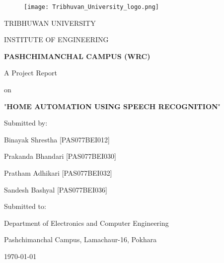 \documentclass[12pt, a4paper, oneside]{report}
\begin{document}
\begin{titlepage}
    \centering
    \begin{figure}
        \centering
        \texttt{[image: Tribhuvan\_University\_logo.png]}
    \end{figure}

    \vspace{1cm}

    {\large{ \MakeUppercase {Tribhuwan University}}\par}
    {\large{ \MakeUppercase {Institute Of Engineering}}\par}
    \vspace{.1cm}
    {\textbf{ \large \MakeUppercase {Pashchimanchal Campus (WRC)}}\par}
    \vspace{2cm}

    {\fontsize{15pt}{18pt}\selectfont 
    A Project Report \par}
    {\fontsize{15pt}{18pt}\selectfont 
    on \par}

    {\large {"\textbf{\MakeUppercase {HOME AUTOMATION USING SPEECH RECOGNITION}}"}\par}
    \vspace{2cm}

    {\fontsize{15pt}{18pt}\selectfont 
        Submitted by:\par
        Binayak Shrestha [PAS077BEI012]\par
        Prakanda Bhandari [PAS077BEI030]\par
        Pratham Adhikari [PAS077BEI032]\par
        Sandesh Bashyal [PAS077BEI036]\par}
    \vspace{2cm}
    
    {\fontsize{15pt}{18pt}\selectfont 
        Submitted to:\par
        Department of Electronics and Computer Engineering\par
        Pashchimanchal Campus, Lamachaur-16, Pokhara\par}
    \vspace{2cm}

    
    {\today\par} %
    
    \vfill

    


\end{titlepage}
\end{document}
